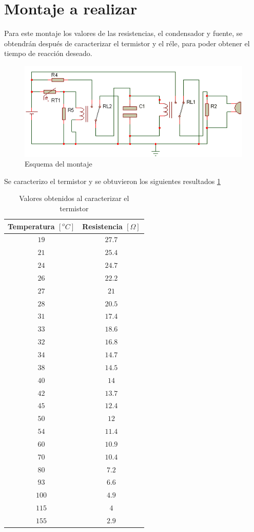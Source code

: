 \documentclass[twocolumn]{IEEEtran}
\begin{document}
\section{Montaje a realizar}
\noindent
Para este montaje los valores de las resistencias, el condensador y fuente, se obtendrán después de caracterizar el termistor y el réle, para poder obtener el tiempo de reacción deseado.
\begin{figure}[H]
	\centering
		\includegraphics[scale=1]{montaje.png}
	\caption{Esquema del montaje}
	\label{fig2}
\end{figure} 
\noindent
Se caracterizo el termistor y se obtuvieron los siguientes resultados \ref{tab1}
\begin{table}[H]
	\centering
\begin{tabular}[c]{|c||c|} \hline
Temperatura $[^{o}C]$ & Resistencia $[\Omega]$ \\ \hline
$19$ & $27.7$ \\ \hline
$21$ & $25.4$ \\ \hline
$24$ & $24.7$ \\ \hline
$26$ & $22.2$ \\ \hline
$27$ & $21$ \\ \hline
$28$ & $20.5$ \\ \hline
$31$ & $17.4$ \\ \hline
$33$ & $18.6$ \\ \hline
$32$ & $16.8$ \\ \hline
$34$ & $14.7$ \\ \hline
$38$ & $14.5$ \\ \hline
$40$ & $14$ \\ \hline
$42$ & $13.7$ \\ \hline
$45$ & $12.4$ \\ \hline
$50$ & $12$ \\ \hline
$54$ & $11.4$ \\ \hline
$60$ & $10.9$ \\ \hline
$70$ & $10.4$ \\ \hline
$80$ & $7.2$ \\ \hline
$93$ & $6.6$ \\ \hline
$100$ & $4.9$ \\ \hline
$115$ & $4$ \\ \hline
$155$ & $2.9$ \\ \hline
\end{tabular}
	\caption{Valores obtenidos al caracterizar el termistor}
	\label{tab1}
\end{table}
\end{document}
